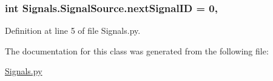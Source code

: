 \subsubsection[{\texorpdfstring{next\+Signal\+ID}{nextSignalID}}]{\setlength{\rightskip}{0pt plus 5cm}int Signals.\+Signal\+Source.\+next\+Signal\+ID = 0\hspace{0.3cm}{\ttfamily [static]}, {\ttfamily [inherited]}}\hypertarget{classSignals_1_1SignalSource_abcff0d069f17cb5ebe3eff15b6283a64}{}\label{classSignals_1_1SignalSource_abcff0d069f17cb5ebe3eff15b6283a64}


Definition at line 5 of file Signals.\+py.



The documentation for this class was generated from the following file\+:\begin{DoxyCompactItemize}
\item 
\hyperlink{Signals_8py}{Signals.\+py}\end{DoxyCompactItemize}
